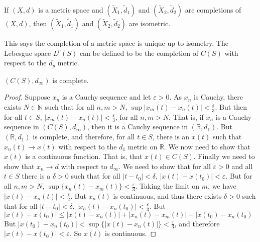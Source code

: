 \documentclass[crop=false,class=article,oneside]{standalone}
\begin{document}
            \begin{theorem}
                If $(X,d)$ is a metric space
                and $(\tilde{X}_{1},\tilde{d}_{1})$
                and $(\tilde{X}_{2},\tilde{d}_{2})$
                are completions of $(X,d)$, then
                $(\tilde{X}_{1},\tilde{d}_{1})$
                and $(\tilde{X}_{2},\tilde{d}_{2})$
                are isometric.
            \end{theorem}
            This says the completion of a metric space is
            unique up to isometry.
            The Lebesgue space $L^{p}(S)$
            can be defined to be the completion of
            $C(S)$ with respect to the $d_{p}$ metric.
            \begin{theorem}
                $(C(S),d_{\infty})$ is complete.
            \end{theorem}
            \begin{proof}
                Suppose $x_{n}$ is a Cauchy sequence
                and let $\varepsilon>0$. As $x_{n}$ is
                Cauchy, there exists $N\in\mathbb{N}$
                such that for all $n,m>N$,
                $\sup|x_{m}(t)-x_{n}(t)|<\frac{\varepsilon}{3}$.
                But then for all $t\in{S}$,
                $|x_{m}(t)-x_{n}(t)|<\frac{\varepsilon}{3}$,
                for all
                $n,m>N$. That is, if $x_{n}$ is
                a Cauchy sequence in $(C(S),d_{\infty})$,
                then it is a Cauchy sequence in
                $(\mathbb{R},d_{1})$. But
                $(\mathbb{R},d_{1})$ is complete, and
                therefore, for all $t\in{S}$, there is
                an $x(t)$ such that
                $x_{n}(t)\rightarrow{x(t)}$ with respect
                to the $d_{1}$ metric on $\mathbb{R}$. We
                now need to show that $x(t)$ is a continuous
                function. That is, that
                $x(t)\in{C(S)}$. Finally we need to show that
                $x_{n}\rightarrow{d}$ with respect to
                $d_{\infty}$. We need to show that
                for all $\varepsilon>0$ and all $t\in{S}$
                there is a $\delta>0$
                such that for all $|t-t_{0}|<\delta$,
                $|x(t)-x(t_{0})|<\varepsilon$. But for
                all $n,m>N$,
                $\sup\{x_{n}(t)-x_{m}(t)\}<\frac{\varepsilon}{3}$.
                Taking the limit on $m$, we have
                $|x(t)-x_{n}(t)|<\frac{\varepsilon}{2}$.
                But $x_{n}(t)$ is continuous, and thus
                there exists $\delta>0$ such that
                for all $|t-t_{0}|<\delta$,
                $|x_{n}(t)-x_{n}(t_{0})|<\frac{\varepsilon}{3}$.
                But
                $|x(t)-x(t_{0})|\leq%
                  |x(t)-x_{n}(t)|%
                 +|x_{n}(t)-x_{m}(t)|%
                 +|x(t_{0})-x_{n}(t_{0})$
                But
                $|x(t_{0})-x_{n}(t_{0})|<%
                 \sup\{|x(t)-x_{n}(t)|\}<\frac{\varepsilon}{3}$,
                and therefore
                $|x(t)-x(t_{0})|<\varepsilon$.
                So $x(t)$ is continuous.
            \end{proof}
\end{document}
